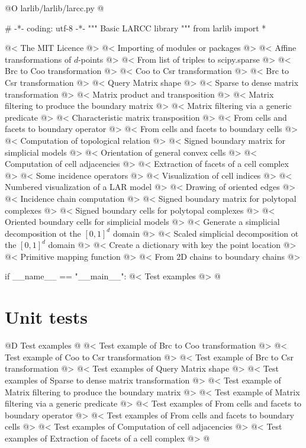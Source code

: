 \documentclass[11pt,oneside]{article}    %
\begin{document}
@O larlib/larlib/larcc.py
@{# -*- coding: utf-8 -*-
""" Basic LARCC library """
from larlib import *

@< The MIT Licence @>
@< Importing of modules or packages @>
@< Affine transformations of $d$-points @>
@< From list of triples to scipy.sparse @>
@< Brc to Coo transformation @>
@< Coo to Csr transformation @>
@< Brc to Csr transformation @>
@< Query Matrix shape @>
@< Sparse to dense matrix transformation @>
@< Matrix product and transposition @>
@< Matrix filtering to produce the boundary matrix @>
@< Matrix filtering via a generic predicate @>
@< Characteristic matrix transposition @>
@< From cells and facets to boundary operator @>
@< From cells and facets to boundary cells @>
@< Computation of topological relation @>
@< Signed boundary matrix for simplicial models @>
@< Orientation of general convex cells @>
@< Computation of cell adjacencies @>
@< Extraction of facets of a cell complex @>
@< Some incidence operators @>
@< Visualization of cell indices @>
@< Numbered visualization of a LAR model @>
@< Drawing of oriented edges @>
@< Incidence chain computation @>
@< Signed boundary matrix for polytopal complexes @>
@< Signed boundary cells for polytopal complexes @>
@<  Oriented boundary cells for simplicial models @>
@< Generate a simplicial decomposition ot the $[0,1]^d$ domain @>
@< Scaled simplicial decomposition ot the $[0,1]^d$ domain @>
@< Create a dictionary with key the point location @>
@< Primitive mapping function @>
@< From 2D chains to boundary chains @>


if __name__ == "__main__": 
    @< Test examples @>
@}

\section{Unit tests}


@D Test examples
@{
@< Test example of Brc to Coo transformation @>
@< Test example of Coo to Csr transformation @>
@< Test example of Brc to Csr transformation @>
@< Test examples of Query Matrix shape @>
@< Test examples of Sparse to dense matrix transformation @>
@< Test example of Matrix filtering to produce the boundary matrix @>
@< Test example of Matrix filtering via a generic predicate @>
@< Test examples of From cells and facets to boundary operator @>
@< Test examples of From cells and facets to boundary cells @>
@< Test examples of Computation of cell adjacencies @>
@< Test examples of Extraction of facets of a cell complex @>
@}
\end{document}
